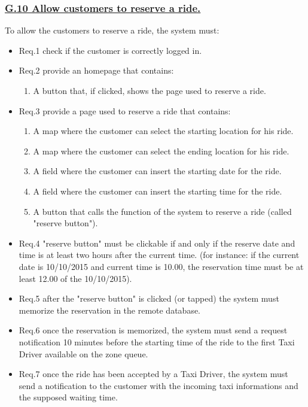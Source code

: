 \documentclass{report}
\begin{document}
			\subsubsection{\lbrack \hyperref[sec:g10]{G.10 Allow customers to reserve a ride.}\rbrack}
			To allow the customers to reserve a ride, the system must:

				\begin{itemize}
					\item \lbrack Req.1\rbrack \label{sec:fr1_g10} check if the customer is correctly logged in.
					\item \lbrack Req.2\rbrack \label{sec:fr2_g10} provide an homepage that contains:
						\begin{enumerate}
							\item A button that, if clicked, shows the page used to reserve a ride.
						\end{enumerate}
					\item \lbrack Req.3\rbrack \label{sec:fr3_g10} provide a page used to reserve a ride that contains:
						\begin{enumerate}
							\item A map where the customer can select the starting location for his ride.
							\item A map where the customer can select the ending location for his ride.
							\item A field where the customer can insert the starting date for the ride.
							\item A field where the customer can insert the starting time for the ride.
							\item A button that calls the function of the system to reserve a ride (called "reserve button").
						\end{enumerate}
					\item \lbrack Req.4\rbrack \label{sec:fr4_g10} "reserve button" must be clickable if and only if the reserve date and time is at least two hours after the current time. (for instance: if the current date is 10/10/2015 and current time is 10.00, the reservation time must be at least 12.00 of the 10/10/2015).
					\item \lbrack Req.5\rbrack \label{sec:fr5_g10} after the "reserve button" is clicked (or tapped) the system must memorize the reservation in the remote database.
					\item \lbrack Req.6\rbrack \label{sec:fr6_g10} once the reservation is memorized, the system must send a request notification 10 minutes before the starting time of the ride to the first Taxi Driver available on the zone queue.
					\item \lbrack Req.7\rbrack \label{sec:fr7_g10} once the ride has been accepted by a Taxi Driver, the system must send a notification to the customer with the incoming taxi informations and the supposed waiting time.
				\end{itemize}
\end{document}
